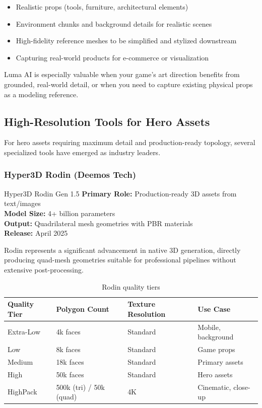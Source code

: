 \documentclass[11pt]{article}
\begin{document}
\begin{itemize}[leftmargin=2em]
  \item Realistic props (tools, furniture, architectural elements)
  \item Environment chunks and background details for realistic scenes
  \item High-fidelity reference meshes to be simplified and stylized downstream
  \item Capturing real-world products for e-commerce or visualization
\end{itemize}

\begin{keypoint}
Luma AI is especially valuable when your game's art direction benefits from grounded, real-world detail, or when you need to capture existing physical props as a modeling reference.
\end{keypoint}

\subsection{High-Resolution Tools for Hero Assets}

For hero assets requiring maximum detail and production-ready topology, several specialized tools have emerged as industry leaders.

\subsubsection{Hyper3D Rodin (Deemos Tech)}

\begin{toolbox}{Hyper3D Rodin Gen 1.5}
\textbf{Primary Role:} Production-ready 3D assets from text/images\\
\textbf{Model Size:} 4+ billion parameters\\
\textbf{Output:} Quadrilateral mesh geometries with PBR materials\\
\textbf{Release:} April 2025
\end{toolbox}

Rodin represents a significant advancement in native 3D generation, directly producing quad-mesh geometries suitable for professional pipelines without extensive post-processing.

\begin{table}[H]
\centering
\small
\begin{tabular}{@{}l l l l@{}}
\toprule
\textbf{Quality Tier} & \textbf{Polygon Count} & \textbf{Texture Resolution} & \textbf{Use Case} \\
\midrule
Extra-Low & 4k faces & Standard & Mobile, background \\
Low & 8k faces & Standard & Game props \\
Medium & 18k faces & Standard & Primary assets \\
High & 50k faces & Standard & Hero assets \\
HighPack & 500k (tri) / 50k (quad) & 4K & Cinematic, close-up \\
\bottomrule
\end{tabular}
\caption{Rodin quality tiers}
\label{tab:rodin-tiers}
\end{table}
\end{document}
